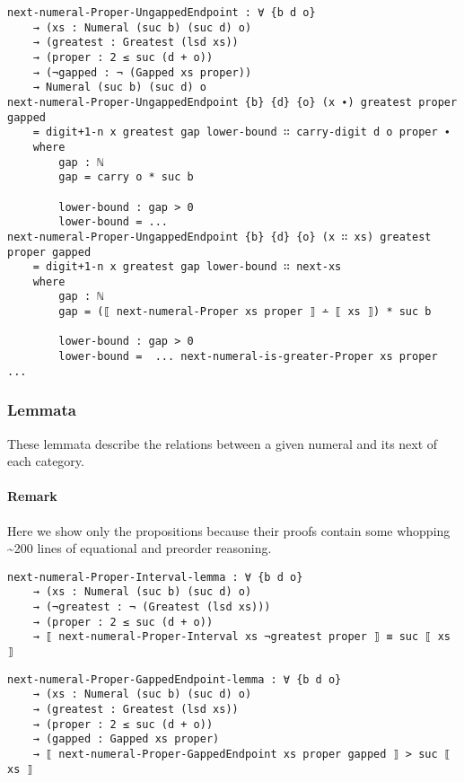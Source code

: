 \documentclass[\main/thesis.tex]{subfiles}
\begin{document}
\begin{lstlisting}[basicstyle=\ttfamily\scriptsize]
next-numeral-Proper-UngappedEndpoint : ∀ {b d o}
    → (xs : Numeral (suc b) (suc d) o)
    → (greatest : Greatest (lsd xs))
    → (proper : 2 ≤ suc (d + o))
    → (¬gapped : ¬ (Gapped xs proper))
    → Numeral (suc b) (suc d) o
next-numeral-Proper-UngappedEndpoint {b} {d} {o} (x ∙) greatest proper gapped
    = digit+1-n x greatest gap lower-bound ∷ carry-digit d o proper ∙
    where
        gap : ℕ
        gap = carry o * suc b

        lower-bound : gap > 0
        lower-bound = ...
next-numeral-Proper-UngappedEndpoint {b} {d} {o} (x ∷ xs) greatest proper gapped
    = digit+1-n x greatest gap lower-bound ∷ next-xs
    where
        gap : ℕ
        gap = (⟦ next-numeral-Proper xs proper ⟧ ∸ ⟦ xs ⟧) * suc b

        lower-bound : gap > 0
        lower-bound =  ... next-numeral-is-greater-Proper xs proper ...
\end{lstlisting}

\subsubsection{Lemmata}

These lemmata describe the relations between a given numeral and its next of
each category.

\paragraph{Remark} Here we show only the propositions because their proofs
contain some whopping \textasciitilde200 lines of equational and preorder reasoning.

\begin{lstlisting}[basicstyle=\ttfamily\scriptsize]
next-numeral-Proper-Interval-lemma : ∀ {b d o}
    → (xs : Numeral (suc b) (suc d) o)
    → (¬greatest : ¬ (Greatest (lsd xs)))
    → (proper : 2 ≤ suc (d + o))
    → ⟦ next-numeral-Proper-Interval xs ¬greatest proper ⟧ ≡ suc ⟦ xs ⟧
\end{lstlisting}

\begin{lstlisting}[basicstyle=\ttfamily\scriptsize]
next-numeral-Proper-GappedEndpoint-lemma : ∀ {b d o}
    → (xs : Numeral (suc b) (suc d) o)
    → (greatest : Greatest (lsd xs))
    → (proper : 2 ≤ suc (d + o))
    → (gapped : Gapped xs proper)
    → ⟦ next-numeral-Proper-GappedEndpoint xs proper gapped ⟧ > suc ⟦ xs ⟧
\end{lstlisting}
\end{document}
